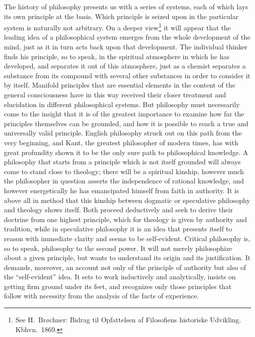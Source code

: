 \documentclass[12pt]{book}
\newcommand{\opage}[1]{\marginnote{\footnotesize\textit{[#1]}}}
\begin{document}
The history of philosophy presents us with a series of systems, each of which lays
its own principle at the basis. Which principle is seized upon in the particular
system is naturally not arbitrary. On a deeper view\footnote{See H.~Brøchner:
Bidrag til Opfattelsen af Filosofiens historiske Udvikling. Kbhvn.\ 1869.} it will
appear that the leading idea of a philosophical system emerges from the whole
development of the mind, just as it in turn acts back upon that development. The
individual thinker finds his principle, so to speak, in the spiritual atmosphere in
which he has developed, and separates it out of this atmosphere, just as a chemist
separates a substance from its compound with several other substances in order to
consider it by itself. Manifold principles that are essential elements in the
content of the general consciousness have in this way received their closer
treatment and elucidation in different philosophical systems. But philosophy must
necessarily come to the insight that it is of the greatest importance to examine
how far the principles themselves can be grounded, and how it is possible to reach a
true and universally valid principle. English philosophy struck out on this path
from the very beginning, and \opage{6}Kant, the greatest philosopher of modern times,
has with great profundity shown it to be the only sure path to philosophical
knowledge. A philosophy that starts from a principle which is not itself grounded
will always come to stand close to theology; there will be a spiritual kinship,
however much the philosopher in question asserts the independence of rational
knowledge, and however energetically he has emancipated himself from faith in
authority. It is above all in method that this kinship between dogmatic or
speculative philosophy and theology shows itself. Both proceed deductively and seek
to derive their doctrine from one highest principle, which for theology is given by
authority and tradition, while in speculative philosophy it is an idea that presents
itself to reason with immediate clarity and seems to be self-evident. Critical
philosophy is, so to speak, philosophy to the second power. It will not merely
philosophize about a given principle, but wants to understand its origin and its
justification. It demands, moreover, an account not only of the principle of
authority but also of the ``self-evident'' idea. It sets to work inductively and
analytically, insists on getting firm ground under its feet, and recognizes only
those principles that follow with necessity from the analysis of the facts of
experience.
\end{document}
